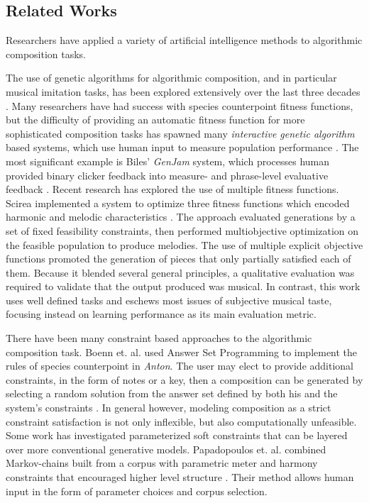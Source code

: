 \documentclass{article}
\begin{document}
\begin{multicols}{2}
	\section{Related Works}
    Researchers have applied a variety of artificial intelligence methods to algorithmic composition tasks.

    The use of genetic algorithms for algorithmic composition, and in particular musical imitation tasks, has been explored extensively over the last three decades \cite{Miranda:2007:ECM:1197666}. Many researchers have had success with species counterpoint fitness functions, but the difficulty of providing an automatic fitness function for more sophisticated composition tasks has spawned many \textit{interactive genetic algorithm} based systems, which use human input to measure population performance \cite{Fernandez:2013:AMA:2591248.2591260}. The most significant example is Biles' \textit{GenJam} system, which processes human provided binary clicker feedback into measure- and phrase-level evaluative feedback \cite{Biles94genjam:a}.  Recent research has explored the use of multiple fitness functions. Scirea implemented a system to optimize three fitness functions which encoded harmonic and melodic characteristics \cite{Scirea2016}. The approach evaluated  generations by a set of fixed feasibility constraints, then performed multiobjective optimization on the feasible population to produce melodies. The use of multiple explicit objective functions promoted the generation of pieces that  only  partially satisfied each of them.  Because it blended several general principles, a qualitative evaluation was required to validate that the output produced was musical. In contrast, this work uses well defined tasks and eschews most issues of subjective musical taste, focusing instead on learning performance as its main evaluation metric.

 	There have been many constraint based approaches to the algorithmic composition task. Boenn et. al. used Answer Set Programming to implement the rules of species counterpoint in \textit{Anton}. The user may elect to provide additional constraints, in the form of notes or a key, then a composition can be generated by selecting a random solution from the answer set defined by both his and the system's constraints \cite{Boenn2008}. In general however, modeling composition as a strict constraint satisfaction is not only inflexible, but also computationally unfeasible. Some work has investigated parameterized soft constraints that can be layered over more conventional generative models. Papadopoulos et. al. combined Markov-chains built from a corpus with parametric meter and harmony constraints that encouraged higher level structure \cite{Papadopoulos2016}. Their method allows human input in the form of parameter choices and corpus selection.


\end{multicols}
\end{document}
